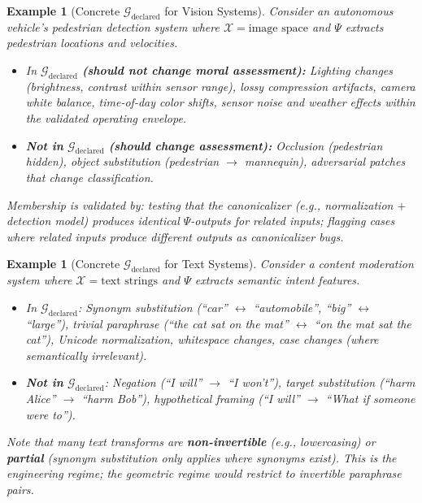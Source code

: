 \documentclass[12pt]{article}
\newtheorem{example}[theorem]{Example}
\begin{document}
\begin{example}[Concrete $\mathcal{G}_{\text{declared}}$ for Vision Systems]
\emph{Consider an autonomous vehicle's pedestrian
detection system where $\mathcal{X} = \text{image space}$ and $\Psi$ extracts pedestrian locations and velocities.}
\begin{itemize}
\item \emph{In} $\mathcal{G}_{\text{declared}}$ \emph{\textbf{(should not change moral assessment):}} \emph{Lighting changes (brightness, contrast within sensor range), lossy compression artifacts, camera white balance, time-of-day
color shifts, sensor noise and weather effects within the validated operating envelope.}
\item \emph{\textbf{Not in}} $\mathcal{G}_{\text{declared}}$ \emph{\textbf{(should change assessment):}} \emph{Occlusion (pedestrian hidden), object substitution (pedestrian $\to$ mannequin), adversarial patches that change classification.}
\end{itemize}

\emph{Membership is validated by: testing that the canonicalizer (e.g., normalization $+$ detection model)
produces identical $\Psi$-outputs for related inputs; flagging cases where related inputs produce different
outputs as canonicalizer bugs.}
\end{example}

\begin{example}[Concrete $\mathcal{G}_{\text{declared}}$ for Text Systems]
\emph{Consider a content moderation system where
$\mathcal{X} = \text{text strings}$ and $\Psi$ extracts semantic intent features.}
\begin{itemize}
\item \emph{In} $\mathcal{G}_{\text{declared}}$\emph{: Synonym substitution (``car'' $\leftrightarrow$ ``automobile'', ``big'' $\leftrightarrow$ ``large''), trivial paraphrase (``the cat sat on the mat'' $\leftrightarrow$ ``on the mat sat the cat''), Unicode normalization, whitespace changes, case changes (where semantically irrelevant).}
\item \emph{\textbf{Not in}} $\mathcal{G}_{\text{declared}}$\emph{: Negation (``I will'' $\to$ ``I won't''), target substitution (``harm Alice'' $\to$
``harm Bob''), hypothetical framing (``I will'' $\to$ ``What if someone were to'').}
\end{itemize}

\emph{Note that many text transforms are \textbf{non-invertible} (e.g., lowercasing) or \textbf{partial} (synonym substitution only applies where synonyms exist). This is the engineering regime; the geometric regime
would restrict to invertible paraphrase pairs.}
\end{example}
\end{document}
